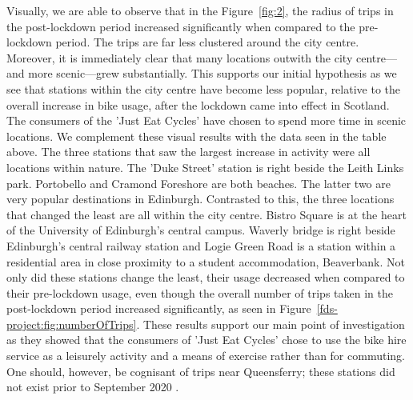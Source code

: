 \documentclass[11pt,a4paper]{article}
\begin{document}
Visually, we are able to observe that in the Figure~\ref{fig:2}, the radius of trips in the post-lockdown period increased significantly when compared to the pre-lockdown period. The trips are far less clustered around the city centre. Moreover, it is immediately clear that many locations outwith the city centre—and more scenic—grew substantially. This supports our initial hypothesis as we see that stations within the city centre have become less popular, relative to the overall increase in bike usage, after the lockdown came into effect in Scotland. The consumers of the 'Just Eat Cycles' have chosen to spend more time in scenic locations. We complement these visual results with the data seen in the table above. The three stations that saw the largest increase in activity were all locations within nature. The 'Duke Street' station is right beside the Leith Links park. Portobello and Cramond Foreshore are both beaches. The latter two are very popular destinations in Edinburgh. Contrasted to this, the three locations that changed the least are all within the city centre. Bistro Square is at the heart of the University of Edinburgh's central campus. Waverly bridge is right beside Edinburgh's central railway station and Logie Green Road is a station within a residential area in close proximity to a student accommodation, Beaverbank. Not only did these stations change the least, their usage decreased when compared to their pre-lockdown usage, even though the overall number of trips taken in the post-lockdown period increased significantly, as seen in Figure~\ref{fds-project:fig:numberOfTrips}. These results support our main point of investigation as they showed that the consumers of 'Just Eat Cycles' chose to use the bike hire service as a leisurely activity and a means of exercise rather than for commuting. One should, however, be cognisant of trips near Queensferry; these stations did not exist prior to September 2020 \cite{Dalton1}.
\end{document}
